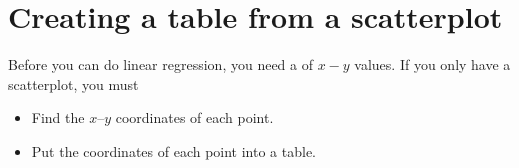 \section{Creating a table from a scatterplot}

\begin{tcolorbox}[center,width=5.5in]
    \small
    Before you can do linear regression, you need a  of $x-y$ values. 
    If you only have a scatterplot, you must 
    \begin{itemize}[nosep]
        \item Find the $x$--$y$ coordinates of each point.
        \item Put the coordinates of each point into a table.
    \end{itemize}
\end{tcolorbox}

\vspace{-1\onelineskip}
